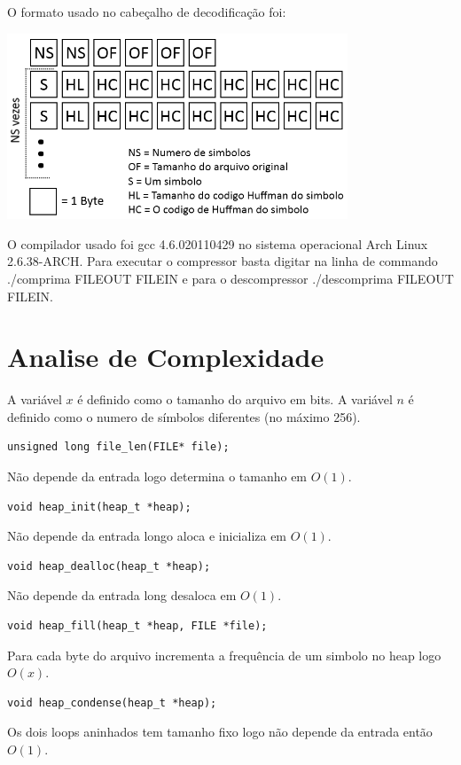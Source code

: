 \documentclass[a4paper, 11pt]{article}
\begin{document}
O formato usado no cabeçalho de decodificação foi:
\begin{center}
\includegraphics[width=4in]{header.png}
\end{center}

O compilador usado foi gcc 4.6.020110429 no sistema operacional Arch Linux 2.6.38-ARCH. Para executar o compressor basta digitar na linha de commando ./comprima FILEOUT FILEIN e para o descompressor ./descomprima FILEOUT FILEIN.

\section{Analise de Complexidade}
A variável $x$ é definido como o tamanho do arquivo em bits. A variável $n$ é definido como o numero de símbolos diferentes (no máximo 256).

\begin{verbatim}
unsigned long file_len(FILE* file);
\end{verbatim} 
Não depende da entrada logo determina o tamanho em $O(1)$.

\begin{verbatim}
void heap_init(heap_t *heap);
\end{verbatim} 
Não depende da entrada longo aloca e inicializa em $O(1)$.

\begin{verbatim}
void heap_dealloc(heap_t *heap);
\end{verbatim} 
Não depende da entrada long desaloca em $O(1)$.

\begin{verbatim}
void heap_fill(heap_t *heap, FILE *file);
\end{verbatim} 
Para cada byte do arquivo incrementa a frequência de um simbolo no heap logo $O(x)$.

\begin{verbatim}
void heap_condense(heap_t *heap);
\end{verbatim} 
Os dois loops aninhados tem tamanho fixo logo não depende da entrada então $O(1)$.
\end{document}
